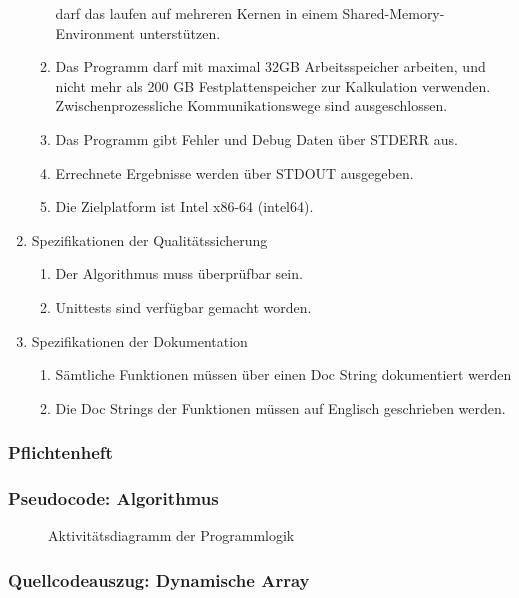 \begin{enumerate}
\begin{enumerate}
		darf das laufen auf mehreren Kernen in einem Shared-Memory-Environment
		unterstützen.
		\item Das Programm darf mit maximal 32GB Arbeitsspeicher arbeiten, und nicht mehr
		als 200 GB Festplattenspeicher zur Kalkulation verwenden. Zwischenprozessliche Kommunikationswege
		sind ausgeschlossen.
		\item Das Programm gibt Fehler und Debug Daten über STDERR aus.
		\item Errechnete Ergebnisse werden über STDOUT ausgegeben.
		\item Die Zielplatform ist Intel x86-64 (intel64).
	\end{enumerate}
	\item Spezifikationen der Qualitätssicherung
	\begin{enumerate}
		\item Der Algorithmus muss überprüfbar sein.
		\item Unittests sind verfügbar gemacht worden.
	\end{enumerate}
	\item Spezifikationen der Dokumentation
	\begin{enumerate}
		\item Sämtliche Funktionen müssen über einen Doc String dokumentiert werden
		\item Die Doc Strings der Funktionen müssen auf Englisch geschrieben werden.
	\end{enumerate}
\end{enumerate}


\subsubsection{Pflichtenheft}
\label{auszug:pflichtenheft}

\subsubsection{Pseudocode: Algorithmus}
\begin{figure}[!htp]
	\caption{Aktivitätsdiagramm der Programmlogik}
	\label{listing:pseudocode}
	
	\centering
\end{figure}

\subsubsection{Quellcodeauszug: Dynamische Array}


